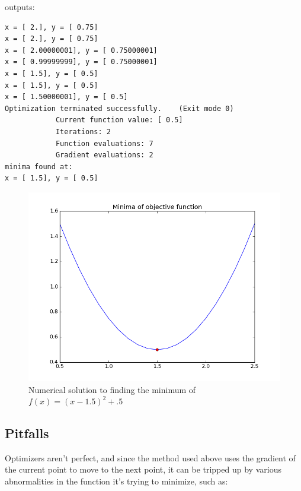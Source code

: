\noindent\begin{minipage}{\linewidth}
\noindent outputs:
\begin{lstlisting}[style=python]
x = [ 2.], y = [ 0.75]
x = [ 2.], y = [ 0.75]
x = [ 2.00000001], y = [ 0.75000001]
x = [ 0.99999999], y = [ 0.75000001]
x = [ 1.5], y = [ 0.5]
x = [ 1.5], y = [ 0.5]
x = [ 1.50000001], y = [ 0.5]
Optimization terminated successfully.    (Exit mode 0)
            Current function value: [ 0.5]
            Iterations: 2
            Function evaluations: 7
            Gradient evaluations: 2
minima found at:
x = [ 1.5], y = [ 0.5]
\end{lstlisting}
\end{minipage}

\begin{figure}[h!]
	\centering
	\includegraphics[width=\linewidth]{images/minima.png}
    \caption{Numerical solution to finding the minimum of $f(x) = (x-1.5)^2 + .5$}
\end{figure}
\newpage

\subsection{Pitfalls}
\noindent Optimizers aren't perfect, and since the method used above uses the gradient of the current point to move to the next point, it can be tripped up by various abnormalities in the function it's trying to minimize, such as:

